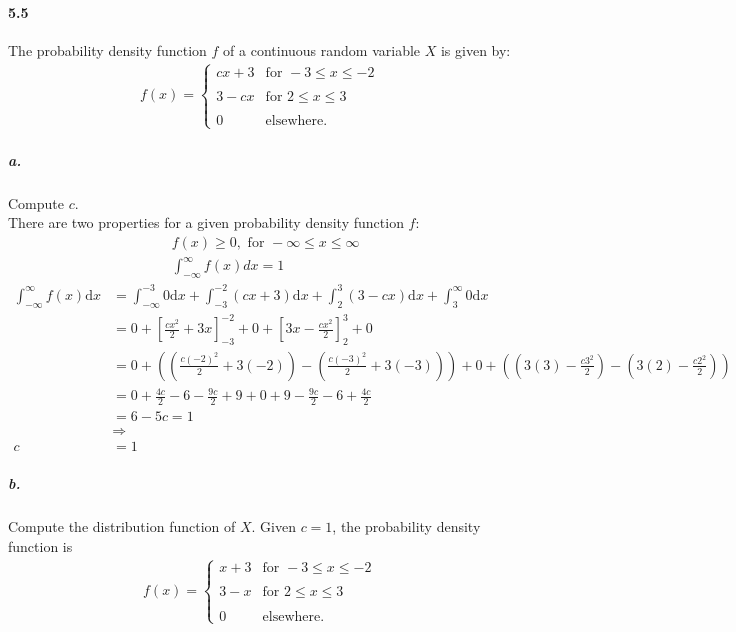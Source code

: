 \documentclass[11pt]{article} %
\begin{document}
\paragraph*{5.5} The probability density function $f$ of a continuous random variable $X$ is given by: 
\begin{align*}
f(x) = \left\lbrace
\begin{array}{ll}
cx + 3  & \text{for } -3 \leq x \leq -2 \\
 & \\
3- cx  & \text{for }  2 \leq x \leq 3 \\
 & \\
0 & \text{elsewhere.}
\end{array} \right.
\end{align*}

\subparagraph*{a.} Compute $c$. \\
There are two properties for a given probability density function $f$: 
\begin{align*}
& f(x) \geq 0,  \text{ for } -\infty \leq x  \leq \infty \\
& \int_{-\infty}^{\infty} f(x) dx = 1  
\end{align*}
\begin{align*}
\int_{-\infty}^{\infty} f(x) \text{d}x & = \int_{-\infty}^{-3} 0 \text{d}x + \int_{-3}^{-2} (cx + 3) \text{d}x + \int_{2}^3 (3-cx) \text{d}x + \int_{3}^{\infty} 0 \text{d} x \\
& = 0 +  \left[ \frac{cx^2}{2}+3x\right]_{-3}^{-2} + 0 + \left[ 3x - \frac{cx^2}{2}\right]_{2}^3 + 0 \\
& = 0 + \left(\left( \frac{c(-2)^2}{2} + 3(-2) \right) -\left( \frac{c(-3)^2}{2} + 3(-3) \right) \right) + 0 + \left( \left(3(3)-\frac{c3^2}{2} \right) - \left(3(2) - \frac{c2^2}{2} \right) \right) \\
& = 0 + \frac{4c}{2} - 6 - \frac{9c}{2} + 9 + 0 + 9 - \frac{9c}{2} - 6 + \frac{4c}{2} \\
& = 6 -5c = 1 \\
& \Longrightarrow  \\
c & = 1 
\end{align*}

\subparagraph*{b.} Compute the distribution function of $X$.
Given $c=1$, the probability density function is
\begin{align*}
f(x) = \left\lbrace
\begin{array}{ll}
x + 3  & \text{for } -3 \leq x \leq -2 \\
 & \\
3- x  & \text{for }  2 \leq x \leq 3 \\
 & \\
0 & \text{elsewhere.}
\end{array} \right.
\end{align*}
\end{document}
